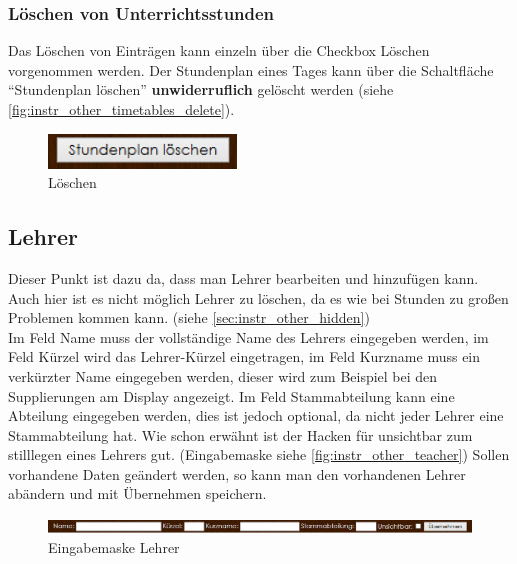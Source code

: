 \subsubsection{Löschen von Unterrichtsstunden}
Das Löschen von Einträgen kann einzeln über die Checkbox Löschen vorgenommen werden. Der Stundenplan eines Tages kann über die Schaltfläche \enquote{Stundenplan löschen} \textbf{unwiderruflich} gelöscht werden (siehe \autoref{fig:instr_other_timetables_delete}).
\begin{figure}[H]
\centering
\includegraphics[keepaspectratio=true, width=5cm]{images/screenshots/timetables_input_delete.png}
\caption{Löschen}
\label{fig:instr_other_timetables_delete}
\end{figure}
\subsection{Lehrer}
Dieser Punkt ist dazu da, dass man Lehrer bearbeiten und hinzufügen kann. Auch hier ist es nicht möglich Lehrer zu löschen, da es wie bei Stunden zu großen Problemen kommen kann. (siehe \autoref{sec:instr_other_hidden})\\
Im Feld Name muss der vollständige Name des Lehrers eingegeben werden, im Feld Kürzel wird das Lehrer-Kürzel eingetragen, im Feld Kurzname muss ein verkürzter Name eingegeben werden, dieser wird zum Beispiel bei den Supplierungen am Display angezeigt. Im Feld Stammabteilung kann eine Abteilung eingegeben werden, dies ist jedoch optional, da nicht jeder Lehrer eine Stammabteilung hat. Wie schon erwähnt ist der Hacken für unsichtbar zum stilllegen eines Lehrers gut. (Eingabemaske siehe \autoref{fig:instr_other_teacher}) Sollen vorhandene Daten geändert werden, so kann man den vorhandenen Lehrer abändern und mit Übernehmen speichern.
\begin{figure}[H]
\centering
\includegraphics[keepaspectratio=true, width=17cm]{images/screenshots/teachers_input.png}
\caption{Eingabemaske Lehrer}
\label{fig:instr_other_teacher}
\end{figure}
